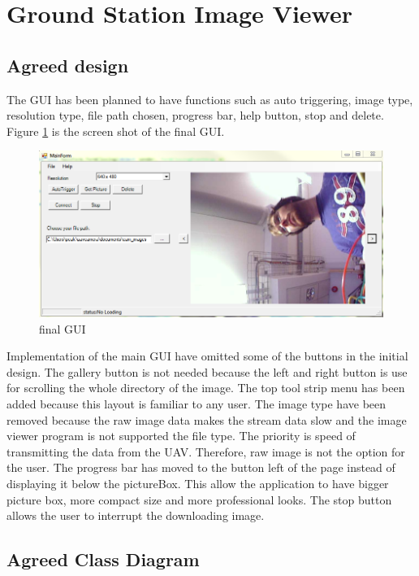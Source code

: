 \section{Ground Station Image Viewer}
\subsection{Agreed design}

The GUI has been planned to have functions such as auto triggering, image type, resolution type, file path chosen, progress bar, help button, stop and delete. Figure \ref{finalGUI} is the screen shot of the final GUI.

\begin{figure}[!hbtp]
\begin{center}
\includegraphics[scale=0.5]{figures/finalGUI.png} 
\end{center}
\caption{final GUI\label{finalGUI}}
\end{figure}
Implementation of the main GUI have omitted some of the buttons in the initial design. 
The gallery button is not needed because the left and right button is use for scrolling the whole directory of the image. 
The top tool strip menu has been added because this layout is familiar to any user. 
The image type have been removed because the raw image data makes the stream data slow and the image viewer program is not supported the file type.
The priority is speed of transmitting the data from the UAV. 
Therefore, raw image is not the option for the user. 
The progress bar has moved to the button left of the page instead of displaying it below the pictureBox.
This allow the application to have bigger picture box, more compact size and more professional looks.
The stop button allows the user to interrupt the downloading image.

\subsection{Agreed Class Diagram}

